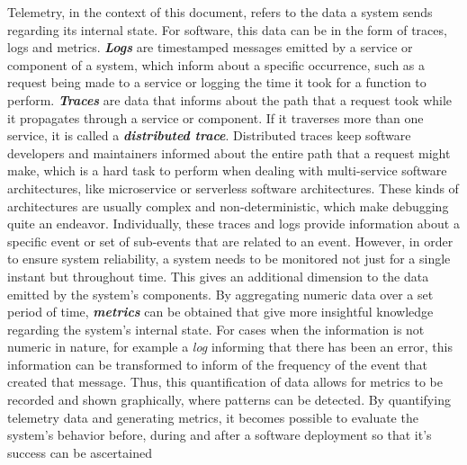 Telemetry, in the context of this document, refers to the data a system sends regarding its internal state. For software, this data can be in the form of traces, logs and metrics.
\textbf{\textit{Logs}} are timestamped messages emitted by a service or component of a system, which inform about a specific occurrence, such as a request being made to a service or logging the time it took for a function to perform.
\textbf{\textit{Traces}} are data that informs about the path that a request took while it propagates through a service or component. If it traverses more than one service, it is called a \textbf{\textit{distributed trace}}. Distributed traces keep software developers and maintainers informed about the entire path that a request might make, which is a hard task to perform when dealing with multi-service software architectures, like microservice or serverless software architectures. These kinds of architectures are usually complex and non-deterministic, which make debugging quite an endeavor. Individually, these traces and logs provide information about a specific event or set of sub-events that are related to an event. However, in order to ensure system reliability, a system needs to be monitored not just for a single instant but throughout time. This gives an additional dimension to the data emitted by the system's components. By aggregating numeric data over a set period of time, \textbf{\textit{metrics}} can be obtained that give more insightful knowledge regarding the system's internal state. For cases when the information is not numeric in nature, for example a \textit{log} informing that there has been an error, this information can be transformed to inform of the frequency of the event that created that message. Thus, this quantification of data allows for metrics to be recorded and shown graphically, where patterns can be detected. By quantifying telemetry data and generating metrics, it becomes possible to evaluate the system's behavior before, during and after a software deployment so that it's success can be ascertained \Parencite{mills1988software}
